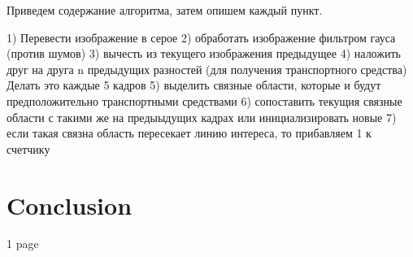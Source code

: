 \documentclass[12pt,a4paper,oneside,titlepage]{article}
\begin{document}
Приведем содержание алгоритма, затем опишем каждый пункт.

1) Перевести изображение в серое
2) обработать изображение фильтром гауса (против шумов)
3) вычесть из текущего изображения предыдущее
4) наложить друг на друга n предыдущих разностей (для получения транспортного средства) Делать это каждые 5 кадров
5) выделить связные области, которые и будут предположительно транспортными средствами 
6) сопоставить текущия связные области с такими же на предыыдущих кадрах или инициализировать новые
7) если такая связна область пересекает линию интереса, то прибавляем 1 к счетчику



\newpage
\section*{Conclusion}
1 page


\newpage
\renewcommand\refname{Bibliography}


\end{document}
